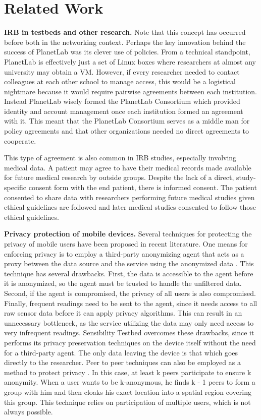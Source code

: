 \section{Related Work}\label{sec-related}

\textbf{IRB in testbeds and other research.}
Note that this concept has occurred before both in the networking context.  
Perhaps the key innovation behind the success
of PlanetLab was its clever use of policies.  From a technical standpoint,
PlanetLab is effectively just a set of Linux boxes where researchers
at almost any university may obtain a VM.  However, if every researcher needed
to contact colleagues at each other school to manage access, this would be
a logistical nightmare because it would require pairwise agreements between
each institution.  Instead PlanetLab wisely formed the PlanetLab Consortium 
which provided identity and account management once each institution formed
an agreement with it.  This meant that the PlanetLab Consortium serves as
a middle man for policy agreements and that other organizations needed no
direct agreements to cooperate.

This type of agreement is also common in IRB studies, especially involving
medical data.  A patient may agree to have their medical records made 
available for future medical research by outside groups.  Despite the lack
of a direct, study-specific consent form with the end patient, there is
informed consent.  The patient consented to share data with researchers
performing future medical studies given ethical guidelines are followed 
and later medical studies consented to follow those ethical guidelines.

\textbf{Privacy protection of mobile devices.}
Several techniques for protecting the privacy of mobile users have
been proposed in recent literature. One means for enforcing privacy is
to employ a third-party anonymizing agent that acts as a proxy between
the data source and the service using the anonymized data
\cite{gruteser2003anonymous, mokbel2006new}. This technique has
several drawbacks. First, the data is accessible to the agent before it is anonymized, 
so the agent must be trusted to handle the unfiltered data. Second, if
the agent is compromised, the privacy of all users is also
compromised. Finally, frequent readings need to be sent to the agent,
since it needs access to all raw sensor data before it can apply
privacy algorithms. This can result in an unnecessary bottleneck, as
the service utilizing the data may only need access to very infrequent
readings. Sensibility Testbed overcomes these drawbacks, since it
performs its privacy preservation techniques on the device itself
without the need for a third-party agent. The only data leaving the
device is that which goes directly to the researcher. Peer to peer techniques 
can also be employed as a method to protect privacy \cite{ghinita2007mobihide}. In this case, 
at least k peers participate to ensure k anonymity. When a user wants 
to be k-anonymous, he finds k - 1 peers to form a group with him and then 
cloaks his exact location into a spatial region covering this group. This technique relies 
on participation of multiple users, which is not always possible.

